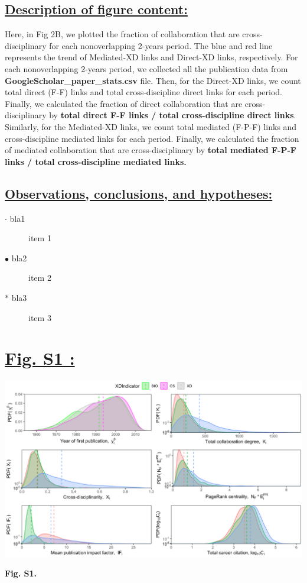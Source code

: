 \documentclass{article}\usepackage[]{graphicx}\usepackage[]{color}
\begin{document}
\subsection*{\underline{Description of figure content:}}
\par{Here, in Fig 2B, we plotted the fraction of collaboration that are cross-disciplinary for each nonoverlapping 2-years period. The blue and red line represents the trend of Mediated-XD links and Direct-XD links, respectively. For each nonoverlapping 2-years period, we collected all the publication data from \textbf{GoogleScholar\_paper\_stats.csv} file. Then, for the Direct-XD links, we count total direct (F-F) links and total cross-discipline direct links for each period. Finally, we calculated the fraction of direct collaboration that are cross-disciplinary by \textbf{total direct F-F links / total cross-discipline direct links}. Similarly, for the Mediated-XD links, we count total mediated (F-P-F) links and cross-discipline mediated links for each period. Finally, we calculated the fraction of mediated collaboration that are cross-disciplinary by \textbf{total mediated F-P-F links / total cross-discipline mediated links.}}
\subsection*{\underline{Observations, conclusions, and hypotheses:}}
\begin{description}
  \item[$\cdot$ bla1] item 1
  \item[$\bullet$ bla2] item 2
  \item[$\ast$ bla3] item 3
\end{description}

\newpage
\section*{\underline{Fig. S1 :}}
\begin{center}
\includegraphics[scale=0.4]{3_ggplot.png}
\newline
\par{\textbf{Fig. S1.}}
\end{center}
\end{document}

